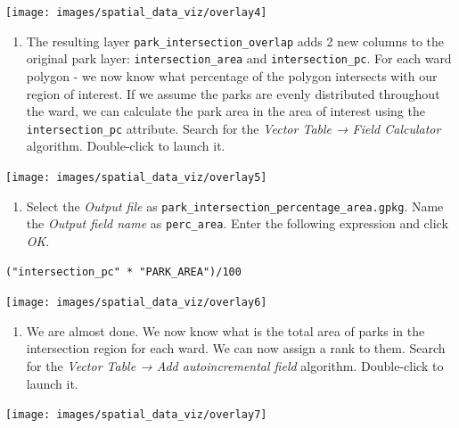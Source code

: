 \documentclass[
  12pt,
  a4paper]{article}
\providecommand{\tightlist}{%
  \setlength{\itemsep}{0pt}\setlength{\parskip}{0pt}}
\begin{document}
\begin{center}\texttt{[image: images/spatial\_data\_viz/overlay4]} \end{center}

\begin{enumerate}
\def\labelenumi{\arabic{enumi}.}
\setcounter{enumi}{4}
\tightlist
\item
  The resulting layer \texttt{park\_intersection\_overlap} adds 2 new
  columns to the original park layer: \texttt{intersection\_area} and
  \texttt{intersection\_pc}. For each ward polygon - we now know what
  percentage of the polygon intersects with our region of interest. If
  we assume the parks are evenly distributed throughout the ward, we can
  calculate the park area in the area of interest using the
  \texttt{intersection\_pc} attribute. Search for the \emph{Vector Table
  → Field Calculator} algorithm. Double-click to launch it.
\end{enumerate}

\begin{center}\texttt{[image: images/spatial\_data\_viz/overlay5]} \end{center}

\begin{enumerate}
\def\labelenumi{\arabic{enumi}.}
\setcounter{enumi}{5}
\tightlist
\item
  Select the \emph{Output file} as
  \texttt{park\_intersection\_percentage\_area.gpkg}. Name the
  \emph{Output field name} as \texttt{perc\_area}. Enter the following
  expression and click \emph{OK}.
\end{enumerate}

\begin{verbatim}
("intersection_pc" * "PARK_AREA")/100
\end{verbatim}

\begin{center}\texttt{[image: images/spatial\_data\_viz/overlay6]} \end{center}

\begin{enumerate}
\def\labelenumi{\arabic{enumi}.}
\setcounter{enumi}{6}
\tightlist
\item
  We are almost done. We now know what is the total area of parks in the
  intersection region for each ward. We can now assign a rank to them.
  Search for the \emph{Vector Table → Add autoincremental field}
  algorithm. Double-click to launch it.
\end{enumerate}

\begin{center}\texttt{[image: images/spatial\_data\_viz/overlay7]} \end{center}
\end{document}
